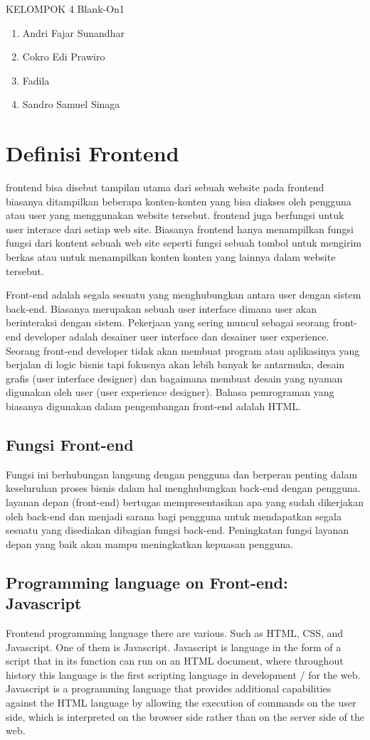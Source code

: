 KELOMPOK 4 Blank-On1
\begin{enumerate}
\item Andri Fajar Sunandhar
\item Cokro Edi Prawiro
\item Fadila
\item Sandro Samuel Sinaga
\end{enumerate}


\section{Definisi Frontend}
frontend bisa disebut tampilan utama dari sebuah website pada frontend biasanya ditampilkan beberapa konten-konten yang bisa diakses oleh pengguna atau user yang menggunakan website tersebut. frontend juga berfungsi untuk user interace dari setiap web site. Biasanya frontend hanya menampilkan fungsi fungsi dari kontent sebuah web site seperti fungsi sebuah tombol untuk mengirim berkas atau untuk menampilkan konten konten yang lainnya dalam website tersebut.

Front-end adalah  segala sesuatu yang menghubungkan antara user dengan sistem back-end. Biasanya merupakan sebuah user interface 
dimana user akan berinteraksi dengan sistem. Pekerjaan yang sering muncul sebagai seorang front-end developer adalah desainer user interface
dan desainer user experience. Seorang front-end developer tidak akan membuat program atau aplikasinya yang berjalan di logic bisnis 
tapi fokusnya akan lebih banyak ke antarmuka, desain grafis (user interface designer) dan bagaimana membuat desain yang nyaman
digunakan oleh user (user experience designer). Bahasa pemrograman yang biasanya digunakan dalam pengembangan front-end adalah HTML.
\subsection{Fungsi Front-end}
Fungsi ini berhubungan langsung dengan pengguna dan berperan penting dalam keseluruhan proses bisnis dalam hal menghubungkan 
back-end dengan pengguna. layanan depan (front-end) bertugas mempresentasikan apa yang sudah dikerjakan oleh back-end
dan menjadi sarana bagi pengguna untuk mendapatkan segala sesuatu yang disediakan dibagian fungsi back-end. Peningkatan fungsi layanan depan yang baik akan mampu meningkatkan kepuasan pengguna.\cite{razaq2014sistem}
\subsection{Programming language on Front-end: Javascript }
Frontend programming language there are various. Such as HTML, CSS, and Javascript. One of them is Javascript. Javascript is language in the form of a script that in its function can run on an HTML document, where throughout history this language is the first scripting language in development / for the web. Javascript is a programming language that provides additional capabilities against the HTML language by allowing the execution of commands on the user side, which is interpreted on the browser side rather than on the server side of the web.\cite{alamsyah2003pengantar}
